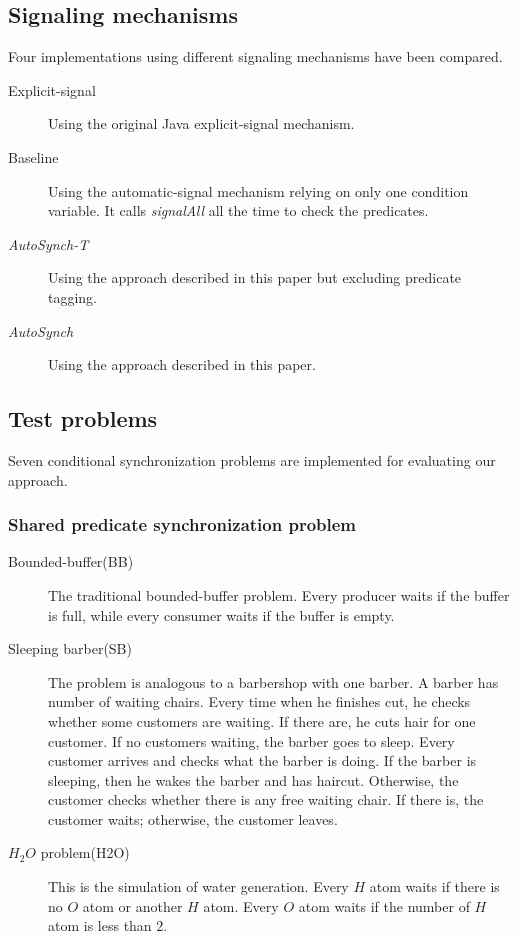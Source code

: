 \documentclass[preprint]{sigplanconf}
\begin{document}
\subsection{Signaling mechanisms}
Four implementations using different signaling mechanisms have been 
compared. 
\begin{description}
    \item[Explicit-signal] Using the original Java explicit-signal mechanism. 
    \item[Baseline] Using the automatic-signal mechanism relying on only
        one condition variable. It calls {\em signalAll} all the time to check the
        predicates.
    \item[{\em AutoSynch-T}] Using the approach described in this paper but excluding
        predicate tagging. 
    \item[{\em AutoSynch}] Using the approach described in this paper. 
\end{description}

\subsection{Test problems}
Seven conditional synchronization problems are implemented for evaluating our
approach. 

\subsubsection{Shared predicate synchronization problem}
\begin{description}
    \item[Bounded-buffer(BB) \cite{dijk65, dijk71}] The traditional 
        bounded-buffer problem. Every producer waits if the buffer is full,
        while every consumer waits if the buffer is empty. 
    \item [Sleeping barber(SB) \cite{dijk65, dijk71}] The problem is analogous 
        to a barbershop with one barber. A barber has number of waiting
        chairs. Every time when he finishes cut, he checks whether some
        customers are waiting. If there are, he cuts hair for one customer. If 
        no customers waiting, the barber goes to sleep. Every customer arrives
        and checks what the barber is doing. If the barber is sleeping, then he 
        wakes the barber and has haircut. Otherwise, the customer checks
        whether there is any free waiting chair. If there is, the customer
        waits; otherwise, the customer leaves. 
    \item [$H_2O$ problem(H2O) \cite{and00}] This is the simulation of water
        generation. Every $H$ atom waits if there is no $O$ atom or another $H$
        atom. Every $O$ atom waits if the number of $H$ atom is less than $2$. 
\end{description}
\end{document}
